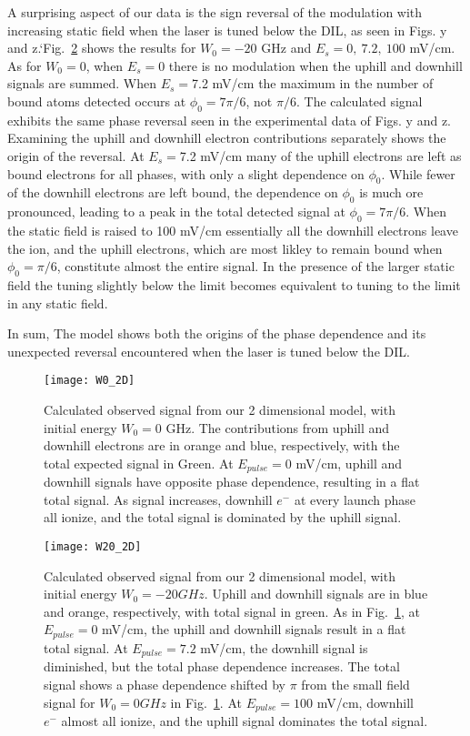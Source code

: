 \documentclass[aps,pra,preprint,groupedaddress]{revtex4-1}
\begin{document}
A surprising aspect of our data is the sign reversal of the modulation with increasing static field when the laser is tuned below the DIL, as seen in Figs. y and z.`Fig.~\ref{fig:2DW20} shows the results for $W_0 = -20$ GHz and $E_s = 0, ~7.2, ~100$ mV/cm. As for $W_0=0$, when $E_s=0$ there is no modulation when the uphill and downhill signals are summed. When $E_s=$7.2 mV/cm the maximum in the number of bound atoms detected occurs at $\phi_0=7\pi/6$, not $\pi/6$. The calculated signal exhibits the same phase reversal seen in the experimental data of Figs. y and z. Examining the uphill and downhill electron contributions separately shows the origin of the reversal. At $E_s=$7.2 mV/cm many of the uphill electrons are left as bound electrons for all phases, with only a slight dependence on $\phi_0$. While fewer of the downhill electrons are left bound, the dependence on $\phi_0$ is much ore pronounced, leading to a peak in the total detected signal at $\phi_0=7\pi/6$. When the static field is raised to 100 mV/cm essentially all the downhill electrons leave the ion, and the uphill electrons, which are most likley to remain bound when $\phi_0=\pi/6$, constitute almost the entire signal. In the presence of the larger static field the tuning slightly below the limit becomes equivalent to tuning to the limit in any static field.

In sum, The model shows both the origins of the phase dependence and its unexpected reversal encountered when the laser is tuned below the DIL.

\begin{figure}
	\texttt{[image: W0\_2D]}
	\caption{Calculated observed signal from our 2 dimensional model, with initial energy $W_0 = 0$ GHz. The contributions from uphill and downhill electrons are in orange and blue, respectively, with the total expected signal in Green. At $E_{pulse} = 0$ mV/cm, uphill and downhill signals have opposite phase dependence, resulting in a flat total signal. As signal increases, downhill $e^-$ at every launch phase all ionize, and the total signal is dominated by the uphill signal.}
	\label{fig:2DW0}
\end{figure}



\begin{figure}
	\texttt{[image: W20\_2D]}
	\caption{Calculated observed signal from our 2 dimensional model, with initial energy $W_0 = -20 GHz$. Uphill and downhill signals are in blue and orange, respectively, with total signal in green. As in Fig.~\ref{fig:2DW0}, at $E_{pulse} = 0$ mV/cm, the uphill and downhill signals result in a flat total signal. At $E_{pulse} = 7.2$ mV/cm, the downhill signal is diminished, but the total phase dependence increases. The total signal shows a phase dependence shifted by $\pi$ from the small field signal for $W_0 = 0 GHz$ in Fig.~\ref{fig:2DW0}. At $E_{pulse} = 100$ mV/cm, downhill $e^-$ almost all ionize, and the uphill signal dominates the total signal.}
	\label{fig:2DW20}
\end{figure}
\end{document}
